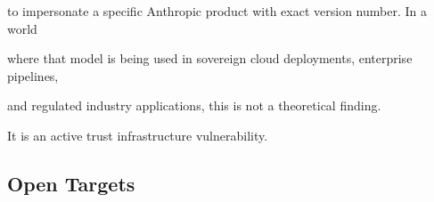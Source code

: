 to impersonate a specific Anthropic product with exact version number. In a world





where that model is being used in sovereign cloud deployments, enterprise pipelines,





and regulated industry applications, this is not a theoretical finding.











It is an active trust infrastructure vulnerability.











\subsection{Open Targets}











